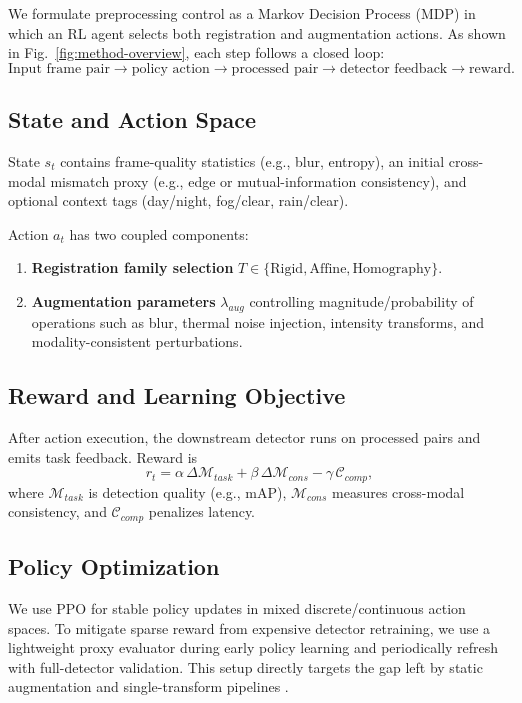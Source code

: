 We formulate preprocessing control as a Markov Decision Process (MDP) in which an RL agent selects both registration and augmentation actions. As shown in Fig.~\ref{fig:method-overview}, each step follows a closed loop:
\[
\text{Input frame pair} \rightarrow \text{policy action} \rightarrow \text{processed pair} \rightarrow \text{detector feedback} \rightarrow \text{reward}.
\]

\subsection{State and Action Space}
State $s_t$ contains frame-quality statistics (e.g., blur, entropy), an initial cross-modal mismatch proxy (e.g., edge or mutual-information consistency), and optional context tags (day/night, fog/clear, rain/clear).

Action $a_t$ has two coupled components:
\begin{enumerate}
    \item \textbf{Registration family selection} $T \in \{\text{Rigid},\text{Affine},\text{Homography}\}$.
    \item \textbf{Augmentation parameters} $\lambda_{aug}$ controlling magnitude/probability of operations such as blur, thermal noise injection, intensity transforms, and modality-consistent perturbations.
\end{enumerate}

\subsection{Reward and Learning Objective}
After action execution, the downstream detector runs on processed pairs and emits task feedback. Reward is
\begin{equation}
    r_t = \alpha\,\Delta\mathcal{M}_{task} + \beta\,\Delta\mathcal{M}_{cons} - \gamma\,\mathcal{C}_{comp},
\end{equation}
where $\mathcal{M}_{task}$ is detection quality (e.g., mAP), $\mathcal{M}_{cons}$ measures cross-modal consistency, and $\mathcal{C}_{comp}$ penalizes latency.

\subsection{Policy Optimization}
We use PPO for stable policy updates in mixed discrete/continuous action spaces. To mitigate sparse reward from expensive detector retraining, we use a lightweight proxy evaluator during early policy learning and periodically refresh with full-detector validation. This setup directly targets the gap left by static augmentation and single-transform pipelines \cite{cubuk2019autoaugment,cubuk2020randaugment,zhang2020content,miao2016cnn}.
